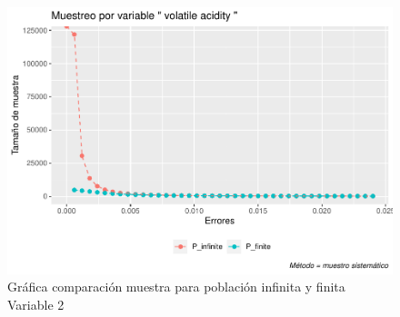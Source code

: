 \documentclass[
]{article}
\begin{document}
\begin{figure}
\centering
\includegraphics{1_examen_solucion_files/figure-latex/grafica var2 sys2-1.pdf}
\caption{Gráfica comparación muestra para población infinita y finita
Variable 2}
\end{figure}
\end{document}
